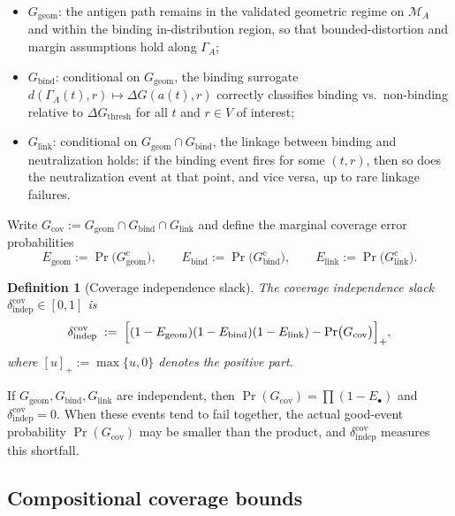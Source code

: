\documentclass[11pt]{article}
\newtheorem{definition}{Definition}
\begin{document}
\begin{itemize}
\item $G_{\mathrm{geom}}$: the antigen path remains in the validated geometric regime on
$\mathcal{M}_A$ and within the binding in-distribution region, so that bounded-distortion and
margin assumptions hold along $\Gamma_A$;

\item $G_{\mathrm{bind}}$: conditional on $G_{\mathrm{geom}}$, the binding surrogate
$d(\Gamma_A(t),r) \mapsto \Delta G(a(t),r)$ correctly classifies binding vs.~non-binding
relative to $\Delta G_{\mathrm{thresh}}$ for all $t$ and $r \in V$ of interest;

\item $G_{\mathrm{link}}$: conditional on $G_{\mathrm{geom}} \cap G_{\mathrm{bind}}$, the linkage between
binding and neutralization holds: if the binding event fires for some $(t,r)$, then so does the
neutralization event at that point, and vice versa, up to rare linkage failures.
\end{itemize}

Write $G_{\mathrm{cov}} := G_{\mathrm{geom}} \cap G_{\mathrm{bind}} \cap G_{\mathrm{link}}$ and define the
marginal coverage error probabilities
\[
E_{\mathrm{geom}} := \Pr\bigl(G_{\mathrm{geom}}^{\mathrm{c}}\bigr),\qquad
E_{\mathrm{bind}} := \Pr\bigl(G_{\mathrm{bind}}^{\mathrm{c}}\bigr),\qquad
E_{\mathrm{link}} := \Pr\bigl(G_{\mathrm{link}}^{\mathrm{c}}\bigr).
\]

\begin{definition}[Coverage independence slack]
\label{def:coverage-independence}
The \emph{coverage independence slack} $\delta_{\mathrm{indep}}^{\mathrm{cov}} \in [0,1]$ is
\[
\delta_{\mathrm{indep}}^{\mathrm{cov}}
\;:=\;
\Bigl[
(1 - E_{\mathrm{geom}})(1 - E_{\mathrm{bind}})(1 - E_{\mathrm{link}})
- \Pr\bigl(G_{\mathrm{cov}}\bigr)
\Bigr]_+,
\]
where $[u]_+ := \max\{u,0\}$ denotes the positive part.
\end{definition}

If $G_{\mathrm{geom}}, G_{\mathrm{bind}}, G_{\mathrm{link}}$ are independent, then
$\Pr(G_{\mathrm{cov}}) = \prod (1-E_{\bullet})$ and
$\delta_{\mathrm{indep}}^{\mathrm{cov}} = 0$. When these events tend to fail together, the actual
good-event probability $\Pr(G_{\mathrm{cov}})$ may be smaller than the product, and
$\delta_{\mathrm{indep}}^{\mathrm{cov}}$ measures this shortfall.

\subsection{Compositional coverage bounds}
\end{document}
